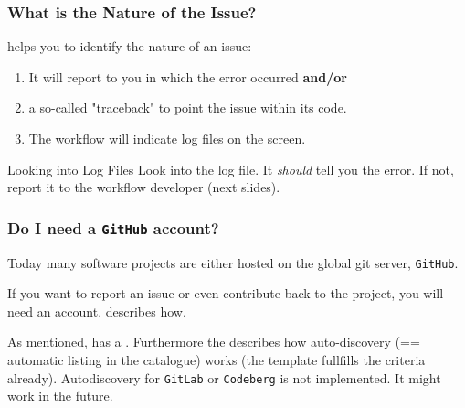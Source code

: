 \begin{frame}
  \frametitle{What is the Nature of the Issue?}
  \Snakemake{} helps you to identify the nature of an issue:
  \begin{enumerate}[<+->]
  	\item It will report to you in which  the error occurred \textbf{and/or}
  	\item a so-called "traceback" to point the issue within its code.
  	\item The workflow will indicate log files on the screen.
  \end{enumerate}
  \pause
  \begin{docs}{Looking into Log Files}
  	Look into the log file. It \textit{should} tell you the error. \pause If not, report it to the workflow developer (next slides). 
  \end{docs}
\end{frame}

\begin{frame}
  \frametitle{Do I need a \texttt{GitHub} account?}
  Today many software projects are either hosted on the global git server, \texttt{GitHub}.
  \begin{docs}
  	If you want to report an issue or even contribute back to the project, you will need an account.  describes how. 
  \end{docs}
  \pause
  \begin{hint}
      As mentioned, \Snakemake has a . Furthermore the  describes how auto-discovery (== automatic listing in the catalogue) works (the template fullfills the criteria already).\newline
      Autodiscovery for \texttt{GitLab} or \texttt{Codeberg} is not implemented. It might work in the future.
  \end{hint}
  
\end{frame}

